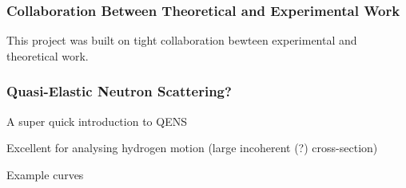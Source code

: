 \subsubsection{Collaboration Between Theoretical and Experimental Work}
\label{sec:cooperation}

This project was built on tight collaboration bewteen experimental and theoretical work.

\placeholder

\subsubsection{Quasi-Elastic Neutron Scattering?}
\label{sec:qens}
\bit
\item A super quick introduction to QENS
\item Excellent for analysing hydrogen motion (large incoherent (?) cross-section)
\item Example curves
\eit


\placeholder
